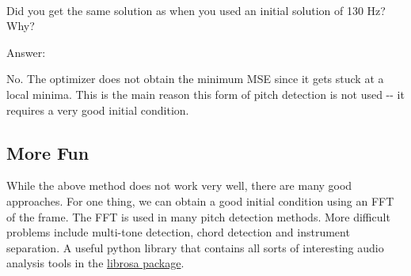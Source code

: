 \documentclass[11pt]{article}
\begin{document}
    \begin{center}
    \end{center}
    { \hspace*{\fill} \\}
    
    Did you get the same solution as when you used an initial solution of
130 Hz? Why?

    Answer:

No. The optimizer does not obtain the minimum MSE since it gets stuck at
a local minima. This is the main reason this form of pitch detection is
not used -\/- it requires a very good initial condition.

    \subsection{More Fun}\label{more-fun}

While the above method does not work very well, there are many good
approaches. For one thing, we can obtain a good initial condition using
an FFT of the frame. The FFT is used in many pitch detection methods.
More difficult problems include multi-tone detection, chord detection
and instrument separation. A useful python library that contains all
sorts of interesting audio analysis tools in the
\href{https://librosa.github.io/librosa/}{librosa package}.


    
    
    
    
\end{document}
